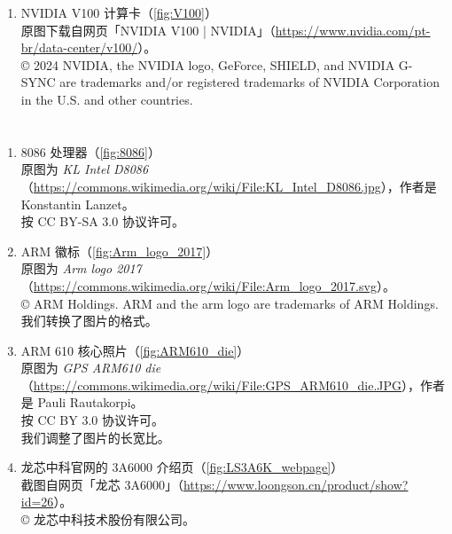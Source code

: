 \begin{enumerate}
  \item NVIDIA V100 计算卡（\autoref{fig:V100}）\\
    原图下载自网页「NVIDIA V100 | NVIDIA」（\url{https://www.nvidia.com/pt-br/data-center/v100/}）。\\
    © 2024 NVIDIA, the NVIDIA logo, GeForce, SHIELD, and NVIDIA G-SYNC are trademarks and/or registered trademarks of NVIDIA Corporation in the U.S. and other countries.
\end{enumerate}

\section{}

\begin{enumerate}
  \item 8086 处理器（\autoref{fig:8086}）\\
    原图为 \textit{KL Intel D8086}（\url{https://commons.wikimedia.org/wiki/File:KL_Intel_D8086.jpg}），作者是 Konstantin Lanzet。\\
    按 CC BY-SA 3.0 协议许可。
  \item ARM 徽标（\autoref{fig:Arm_logo_2017}）\\
    原图为 \textit{Arm logo 2017}（\url{https://commons.wikimedia.org/wiki/File:Arm_logo_2017.svg}）。\\
    © ARM Holdings. ARM and the arm logo are trademarks of ARM Holdings.\\
    我们转换了图片的格式。
  \item ARM 610 核心照片（\autoref{fig:ARM610_die}）\\
    原图为 \textit{GPS ARM610 die}（\url{https://commons.wikimedia.org/wiki/File:GPS_ARM610_die.JPG}），作者是 Pauli Rautakorpi。\\
    按 CC BY 3.0 协议许可。\\
    我们调整了图片的长宽比。
  \item 龙芯中科官网的 3A6000 介绍页（\autoref{fig:LS3A6K_webpage}）\\
    截图自网页「龙芯 3A6000」（\url{https://www.loongson.cn/product/show?id=26}）。\\
    © 龙芯中科技术股份有限公司。
\end{enumerate}
